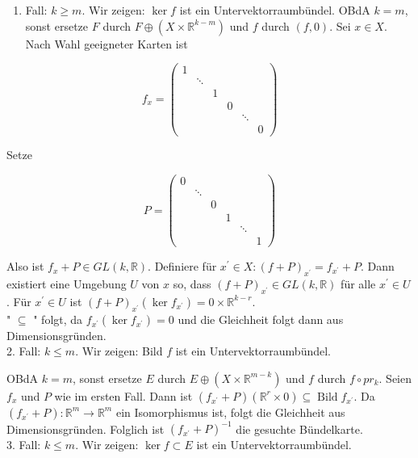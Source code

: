 \begin{enumerate}
  \item Fall: $k \geq m$. Wir zeigen: $\operatorname{ker} f$ ist ein Untervektorraumbündel. OBdA $k=m$, sonst ersetze $F$ durch $F \oplus\left(X \times \mathbb{R}^{k-m}\right)$ und $f$ durch $(f, 0)$. Sei $x \in X$. Nach Wahl geeigneter Karten ist
\end{enumerate}

$$
f_{x}=\left(\begin{array}{cccccc}
1 & & & & & \\
& \ddots & & & & \\
& & 1 & & & \\
& & & 0 & & \\
& & & & \ddots & \\
& & & & & 0
\end{array}\right)
$$

Setze

$$
P=\left(\begin{array}{cccccc}
0 & & & & & \\
& \ddots & & & & \\
& & 0 & & & \\
& & & 1 & & \\
& & & & \ddots & \\
& & & & & 1
\end{array}\right)
$$

Also ist $f_{x}+P \in G L(k, \mathbb{R})$. Definiere für $x^{\prime} \in X:(f+P)_{x^{\prime}}=f_{x^{\prime}}+P$. Dann existiert eine Umgebung $U$ von $x$ so, dass $(f+P)_{x^{\prime}} \in G L(k, \mathbb{R})$ für alle $x^{\prime} \in U$. Für $x^{\prime} \in U$ ist $(f+P)_{x^{\prime}}\left(\operatorname{ker} f_{x^{\prime}}\right)=0 \times \mathbb{R}^{k-r}$.\\
" $\subseteq$ " folgt, da $f_{x^{\prime}}\left(\operatorname{ker} f_{x^{\prime}}\right)=0$ und die Gleichheit folgt dann aus Dimensionsgründen.\\
2. Fall: $k \leq m$. Wir zeigen: Bild $f$ ist ein Untervektorraumbündel.

OBdA $k=m$, sonst ersetze $E$ durch $E \oplus\left(X \times \mathbb{R}^{m-k}\right)$ und $f$ durch $f \circ p r_{k}$. Seien $f_{x}$ und $P$ wie im ersten Fall. Dann ist $\left(f_{x^{\prime}}+P\right)\left(\mathbb{R}^{r} \times 0\right) \subseteq \operatorname{Bild} f_{x^{\prime}}$. Da $\left(f_{x^{\prime}}+P\right): \mathbb{R}^{m} \rightarrow \mathbb{R}^{m}$ ein Isomorphismus ist, folgt die Gleichheit aus Dimensionsgründen. Folglich ist $\left(f_{x^{\prime}}+P\right)^{-1}$ die gesuchte Bündelkarte.\\
3. Fall: $k \leq m$. Wir zeigen: $\operatorname{ker} f \subset E$ ist ein Untervektorraumbündel.

